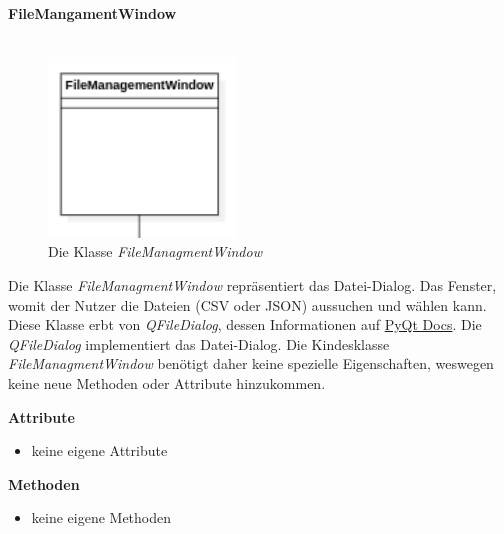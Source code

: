\documentclass{article}
\begin{document}
\newpage
\textbf{\large{FileMangamentWindow}}\\\\
\begin{figure}[H]%
    \centering
    \includegraphics[width=5cm]{entwurf/Entwurf_dokument/img/Alissa/FileManagmentWindow.png}
    \caption{Die Klasse \textit{FileManagmentWindow}}
\end{figure}
Die Klasse \textit{FileManagmentWindow} repräsentiert das Datei-Dialog. Das Fenster, womit der Nutzer die Dateien (CSV oder JSON) aussuchen und wählen kann. Diese Klasse erbt von \textit{QFileDialog}, dessen Informationen auf \href{https://doc.qt.io/qtforpython-5/PySide2/QtWidgets/QFileDialog.html}{PyQt Docs}. Die \textit{QFileDialog} implementiert das Datei-Dialog. Die Kindesklasse \textit{FileManagmentWindow} benötigt daher keine spezielle Eigenschaften, weswegen keine neue Methoden oder Attribute hinzukommen.
\newline \newline

\textbf{{Attribute}}
\begin{itemize}
\item[] keine eigene Attribute
\end{itemize}

\textbf{{Methoden}}
\begin{itemize}
\item[] keine eigene Methoden
\end{itemize}
\end{document}
